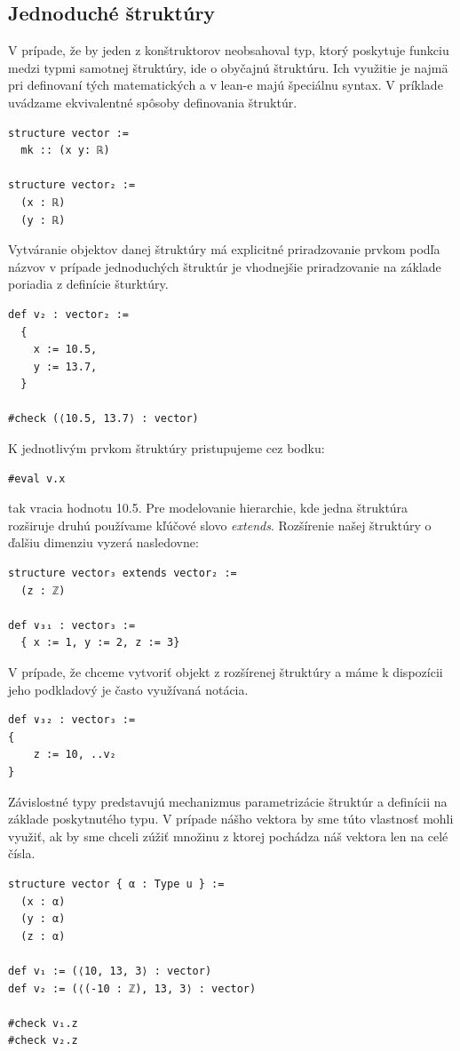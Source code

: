 \documentclass[a4paper,10pt,oneside]{report}%
\begin{document}
\subsection{Jednoduché štruktúry}
    V prípade, že by jeden z konštruktorov neobsahoval typ, ktorý poskytuje funkciu
medzi typmi samotnej štruktúry, ide o obyčajnú štruktúru.
    Ich využitie je najmä pri definovaní tých matematických a v lean-e majú
špeciálnu syntax.
    V príklade uvádzame ekvivalentné spôsoby definovania štruktúr.
\begin{lstlisting}
structure vector :=
  mk :: (x y: ℝ)

structure vector₂ :=
  (x : ℝ)
  (y : ℝ)
\end{lstlisting}
    Vytváranie objektov danej štruktúry má explicitné priradzovanie prvkom
podľa názvov v prípade jednoduchých štruktúr je vhodnejšie priradzovanie na
základe poriadia z definície šturktúry.
\begin{lstlisting}
def v₂ : vector₂ :=
  {
    x := 10.5,
    y := 13.7,
  }

#check (⟨10.5, 13.7⟩ : vector)
\end{lstlisting}
    K jednotlivým prvkom štruktúry pristupujeme cez bodku:
\begin{lstlisting}
#eval v.x
\end{lstlisting}
    tak vracia hodnotu 10.5.
    Pre modelovanie hierarchie, kde jedna štruktúra rozširuje druhú používame
kľúčové slovo \emph{extends}.
    Rozšírenie našej štruktúry o ďalšiu dimenziu vyzerá nasledovne:
\begin{lstlisting}
structure vector₃ extends vector₂ :=
  (z : ℤ)

def ∨₃₁ : vector₃ :=
  { x := 1, y := 2, z := 3}
\end{lstlisting}
    V prípade, že chceme vytvoriť objekt z rozšírenej štruktúry a máme k dispozícii
jeho podkladový je často využívaná notácia.
\begin{lstlisting}
def ∨₃₂ : vector₃ :=
{
    z := 10, ..v₂
}
\end{lstlisting}
    Závislostné typy predstavujú mechanizmus parametrizácie štruktúr a definícii
na základe poskytnutého typu.
    V prípade nášho vektora by sme túto vlastnosť mohli využiť, ak by sme chceli
zúžiť množinu z ktorej pochádza náš vektora len na celé čísla.
\begin{lstlisting}
structure vector { α : Type u } :=
  (x : α)
  (y : α)
  (z : α)

def v₁ := (⟨10, 13, 3⟩ : vector)
def v₂ := (⟨(-10 : ℤ), 13, 3⟩ : vector)

#check v₁.z
#check v₂.z
\end{lstlisting}
\end{document}
